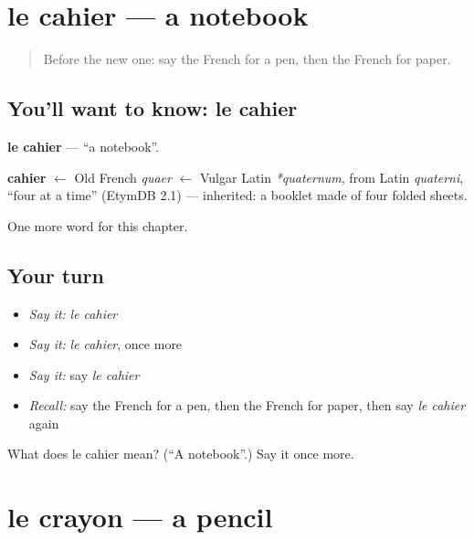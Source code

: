 \section[le cahier]{le cahier — a notebook}

\label{lesson:FR-C78-cahier}



\begin{quote}
Before the new one: say the French for a pen, then the French for paper.
\end{quote}

\subsection*{You'll want to know: le cahier}
\textbf{le cahier} — \textquotedblleft{}a notebook\textquotedblright{}.

\begin{cousinweb}
\textbf{cahier} $\leftarrow$ Old French \emph{quaer} $\leftarrow$ Vulgar Latin \emph{*quaternum}, from Latin \emph{quaterni}, \textquotedblleft{}four at a time\textquotedblright{} (EtymDB 2.1) — inherited: a booklet made of four folded sheets.
\end{cousinweb}

\begin{grammarlens}[title={What you've built}]
One more word for this chapter.
\end{grammarlens}

\subsection*{Your turn}
\begin{itemize}
\raggedright
  \item \emph{Say it:} \emph{le cahier}
  \item \emph{Say it:} \emph{le cahier}, once more
  \item \emph{Say it:} say \emph{le cahier}
  \item \emph{Recall:} say the French for a pen, then the French for paper, then say \emph{le cahier} again
\end{itemize}

\begin{tcolorbox}[breakable,colback=teal!4,colframe=teal!35!black,title={Before you move on}]
What does le cahier mean? (\textquotedblleft{}A notebook\textquotedblright{}.) Say it once more.
\end{tcolorbox}
\section[le crayon]{le crayon — a pencil}

